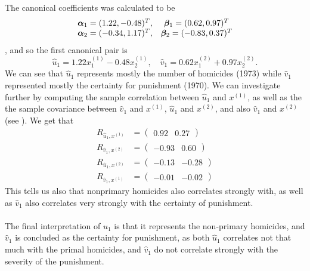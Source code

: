 The canonical coefficients  was calculated to be
\begin{align*}
  \begin{matrix}
     \bm{\alpha}_{1} =  (1.22,   -0.48)^{T},  & \bm{\beta}_{1} =  (0.62,0.97)^{T} \\
  \bm{\alpha}_{2} =  (-0.34, 1.17)^{T},  & \bm{\beta}_{2} = (-0.83, 0.37)^{T}
  \end{matrix}
\end{align*}, 
and so the first canonical pair is
\begin{equation*}
  \hat u_1 = 1.22 x_{1}^{(1)} - 0.48 x_{2}^{(1)} , \quad \hat v_{1} =
  0.62 x_{1}^{(2)} + 0.97 x_{2}^{(2)}. 
\end{equation*}
We can see that $\hat u_{1}$ represents mostly the number of homicides
 (1973) while $\hat v_{1}$ represented mostly the certainty for
 punishment (1970). We can investigate further by computing the sample
 correlation between $\hat u_{1}$ and $x^{(1)}$, as well as the the
 sample covariance between $\hat v_{1}$ and $x^{(1)}$, $\hat u_{1}$ and
 $x^{(2)}$, and also $\hat v_{1}$ and  $x^{(2)}$ (see \cite[p. 552]{book}). We get that
 \begin{align*}
   R_{\hat u_{1}, x^{(1)}} &= \begin{pmatrix}0.92 &0.27   \end{pmatrix} \\
   R_{\hat v_{1}, x^{(2)}} &= \begin{pmatrix}-0.93 &0.60   \end{pmatrix} \\
   R_{\hat u_{1}, x^{(2)}} &= \begin{pmatrix}-0.13 &-0.28 \end{pmatrix} \\   
   R_{\hat v_{1}, x^{(1)}} &= \begin{pmatrix}-0.01 &-0.02   \end{pmatrix} 
 \end{align*}
This tells us also that nonprimary homicides also correlates strongly
with, as well as $\hat v_{1}$ also correlates very strongly with the
certainty of punishment.\\
\\
The final interpretation of $\hat u_{1}$ is that it represents the
non-primary homicides, and $\hat v_{1}$ is concluded as the certainty
for punishment, as both $\hat u_{1}$ correlates not that much with the
primal homicides, and $\hat v_{1}$ do not correlate strongly with the
severity of the punishment.



